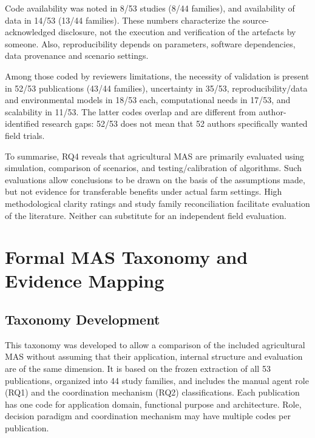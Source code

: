 \documentclass[11pt,a4paper]{article}
\begin{document}
Code availability was noted in 8/53 studies (8/44 families), and availability of data in 14/53 (13/44 families). These numbers characterize the source-acknowledged disclosure, not the execution and verification of the artefacts by someone. Also, reproducibility depends on parameters, software dependencies,
data provenance and scenario settings.

Among those coded by reviewers limitations, the necessity of validation
is present in 52/53 publications (43/44 families), uncertainty in 35/53,
reproducibility/data and environmental models in 18/53 each,
computational needs in 17/53, and scalability in 11/53.
The latter codes overlap and are different from author-identified
research gaps: 52/53 does not mean that 52 authors specifically wanted field trials.

To summarise, RQ4 reveals that agricultural MAS are primarily
evaluated using simulation, comparison of scenarios, and testing/calibration of algorithms. Such evaluations allow conclusions to be drawn on the basis of the assumptions made, but not evidence for transferable benefits under actual farm settings. High methodological clarity ratings and study family reconciliation facilitate evaluation of the literature. Neither can substitute for an independent field evaluation.





\section{Formal MAS Taxonomy and Evidence Mapping}
\label{sec:taxonomy}

\subsection{Taxonomy Development}

This taxonomy was developed to allow a comparison of the included agricultural MAS without assuming that their application, internal structure and evaluation are of the same dimension. It is based on the frozen extraction of all 53 publications, organized into 44 study families, and includes the manual agent role (RQ1) and the coordination mechanism (RQ2) classifications. Each publication has one code for application domain, functional purpose and architecture. Role, decision paradigm and coordination mechanism may have multiple codes per publication.
\end{document}
